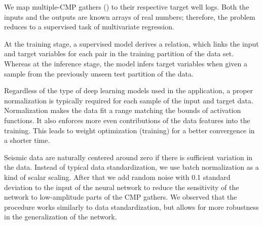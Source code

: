 \documentclass[paper,twocolomn]{geophysics}
\begin{document}

We map multiple-CMP gathers () to their respective target well logs. Both the inputs and the outputs are known arrays of real numbers; therefore, the problem reduces to a supervised task of multivariate regression.  

At the training stage, a supervised model derives a relation, which links the input and target variables for each pair in the training partition of the data set. Whereas at the inference stage, the model infers target variables when given a sample from the previously unseen test partition of the data.

Regardless of the type of deep learning models used in the application, a proper normalization is typically required for each sample of the input and target data. Normalization makes the data fit a range matching the bounds of activation functions. It also enforces more even contributions of the data features into the training. This leads to weight optimization (training) for a better convergence in a shorter time.

Seismic data are naturally centered around zero if there is sufficient variation in the data. Instead of typical data standardization, we use batch normalization as a kind of scalar scaling. After that we add random noise with 0.1 standard deviation to the input of the neural network to reduce the sensitivity of the network to low-amplitude parts of the CMP gathers. We observed that the procedure works similarly to data standardization, but allows for more robustness in the generalization of the network.

\end{document}

